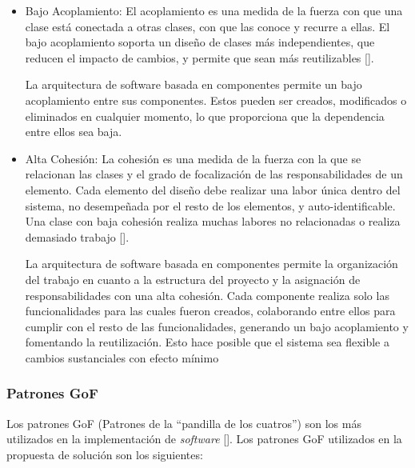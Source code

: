 \begin{itemize}
\item Bajo Acoplamiento: El acoplamiento es una medida de la fuerza con que una clase está conectada a otras clases, con que las conoce y recurre a ellas. El bajo acoplamiento soporta un diseño de clases más independientes, que reducen el impacto de cambios, y permite que sean más reutilizables [\cite{97}].

La arquitectura de software basada en componentes permite un bajo acoplamiento entre sus componentes. Estos pueden ser creados, modificados o eliminados en cualquier momento, lo que proporciona que la dependencia entre ellos sea baja.

\item Alta Cohesión: La cohesión es una medida de la fuerza con la que se relacionan las clases y el grado de focalización de las responsabilidades de un elemento. Cada elemento del diseño debe realizar una labor única dentro del sistema, no desempeñada por el resto de los elementos, y auto-identificable. Una clase con baja cohesión realiza muchas labores no relacionadas o realiza demasiado trabajo [\cite{97}].

La arquitectura de software basada en componentes permite la organización del trabajo en cuanto a la estructura del proyecto y la asignación de responsabilidades con una alta cohesión. Cada componente realiza solo las funcionalidades para las cuales fueron creados, colaborando entre ellos para cumplir con el resto de las funcionalidades, generando un bajo acoplamiento y fomentando la reutilización. Esto hace posible que el sistema sea flexible a cambios sustanciales con efecto mínimo
\end{itemize}

\subsubsection{Patrones GoF}
Los patrones GoF (Patrones de la ``pandilla de los cuatros'') son los más utilizados en la implementación de \textit{software} [\cite{97}]. Los patrones GoF utilizados en la propuesta de solución son los siguientes:

